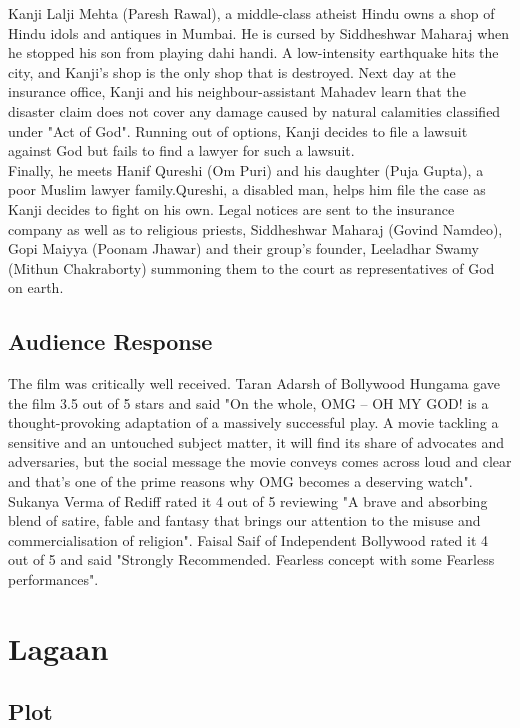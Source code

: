 \documentclass[a4paper]{article}
\begin{document}
Kanji Lalji Mehta (Paresh Rawal), a middle-class atheist Hindu owns a shop of Hindu idols and antiques in Mumbai. He is cursed by Siddheshwar Maharaj when he stopped his son from playing dahi handi. A low-intensity earthquake hits the city, and Kanji's shop is the only shop that is destroyed. Next day at the insurance office, Kanji and his neighbour-assistant Mahadev learn that the disaster claim does not cover any damage caused by natural calamities classified under "Act of God".   Running out of options, Kanji decides to file a lawsuit against God but fails to find a lawyer for such a lawsuit.\\
	Finally, he meets Hanif Qureshi (Om Puri) and his daughter (Puja Gupta), a poor Muslim lawyer family.Qureshi, a disabled man, helps him file the case as Kanji decides to fight on his own. Legal notices are sent to the insurance company as well as to religious priests, Siddheshwar Maharaj (Govind Namdeo), Gopi Maiyya (Poonam Jhawar) and their group's founder, Leeladhar Swamy (Mithun Chakraborty) summoning them to the court as representatives of God on earth.	        
	                  



\subsection{Audience Response}
	   
	The film was critically well received.
Taran Adarsh of Bollywood Hungama gave the film 3.5 out of 5 stars and said "On the whole, OMG – OH MY GOD! is a thought-provoking adaptation of a massively successful play. A movie tackling a sensitive and an untouched subject matter, it will find its share of advocates and adversaries, but the social message the movie conveys comes across loud and clear and that's one of the prime reasons why OMG becomes a deserving watch". Sukanya Verma of Rediff rated it 4 out of 5 reviewing "A brave and absorbing blend of satire, fable and fantasy that brings our attention to the misuse and commercialisation of religion". Faisal Saif of Independent Bollywood rated it 4 out of 5 and said "Strongly Recommended. Fearless concept with some Fearless performances".   	        
	        
	  	
	
	
	  \section{Lagaan }
	  
	  \subsection{Plot}
	 
\end{document}
